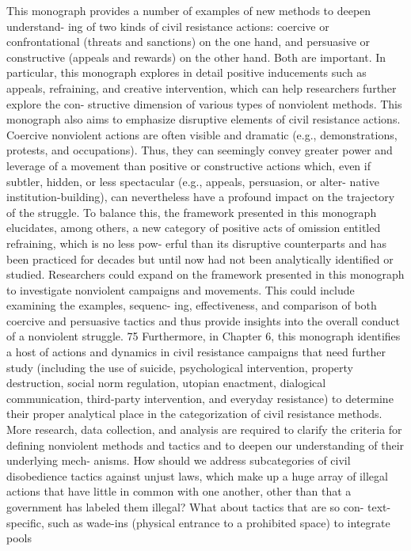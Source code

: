 \documentclass[twoside,a4paper,12pt,fleqn,openany]{extbook}
\begin{document}
This monograph provides a number of examples of new methods to deepen understand-
ing of two kinds of civil resistance actions: coercive or confrontational (threats and sanctions)
on the one hand, and persuasive or constructive (appeals and rewards) on the other hand.
Both are important.
In particular, this monograph explores in detail positive inducements such as appeals,
refraining, and creative intervention, which can help researchers further explore the con-
structive dimension of various types of nonviolent methods. This monograph also aims to
emphasize disruptive elements of civil resistance actions. Coercive nonviolent actions are
often visible and dramatic (e.g., demonstrations, protests, and occupations). Thus, they can
seemingly convey greater power and leverage of a movement than positive or constructive
actions which, even if subtler, hidden, or less spectacular (e.g., appeals, persuasion, or alter-
native institution-building), can nevertheless have a profound impact on the trajectory of the
struggle. To balance this, the framework presented in this monograph elucidates, among
others, a new category of positive acts of omission entitled refraining, which is no less pow-
erful than its disruptive counterparts and has been practiced for decades but until now had
not been analytically identified or studied.
Researchers could expand on the framework presented in this monograph to investigate
nonviolent campaigns and movements. This could include examining the examples, sequenc-
ing, effectiveness, and comparison of both coercive and persuasive tactics and thus provide
insights into the overall conduct of a nonviolent struggle.
75
Furthermore, in Chapter 6, this monograph identifies a host of actions and dynamics in
civil resistance campaigns that need further study (including the use of suicide, psychological
intervention, property destruction, social norm regulation, utopian enactment, dialogical
communication, third-party intervention, and everyday resistance) to determine their proper
analytical place in the categorization of civil resistance methods.
More research, data collection, and analysis are required to clarify the criteria for defining
nonviolent methods and tactics and to deepen our understanding of their underlying mech-
anisms. How should we address subcategories of civil disobedience tactics against unjust
laws, which make up a huge array of illegal actions that have little in common with one another,
other than that a government has labeled them illegal? What about tactics that are so con-
text- specific, such as wade-ins (physical entrance to a prohibited space) to integrate pools
\end{document}
